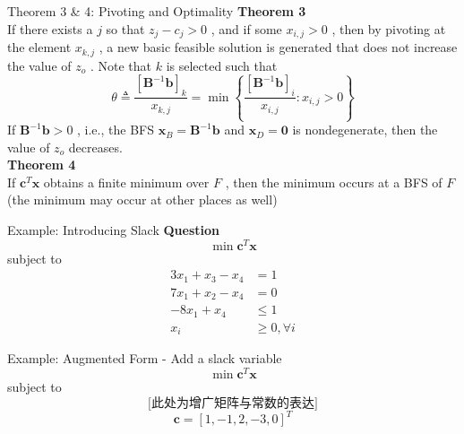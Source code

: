 \documentclass[aspectratio=169,hyperref,UTF8,CJK]{beamer}
\begin{document}
\begin{frame}{Theorem 3 \& 4: Pivoting and Optimality}
\textbf{Theorem 3} \\
If there exists a \(j\) so that \(z_{j} - c_{j} > 0\) , and if some \(x_{i,j} > 0\) , then by pivoting at the element \(x_{k,j}\) , a new basic feasible solution is generated that does not increase the value of \(z_{o}\) . Note that \(k\) is selected such that
\[
\theta \triangleq \frac{[\mathbf{B}^{-1}\mathbf{b}]_{k}}{x_{k,j}} = \min \left\{\frac{[\mathbf{B}^{-1}\mathbf{b}]_{i}}{x_{i,j}}:x_{i,j} > 0\right\}
\]
If \(\mathbf{B}^{- 1}\mathbf{b} > 0\) , i.e., the BFS \(\mathbf{x}_{B} = \mathbf{B}^{- 1}\mathbf{b}\) and \(\mathbf{x}_{D} = \mathbf{0}\) is nondegenerate, then the value of \(z_{o}\) decreases. \\
\textbf{Theorem 4} \\
If \(\mathbf{c}^{T}\mathbf{x}\) obtains a finite minimum over \(F\) , then the minimum occurs at a BFS of \(F\) (the minimum may occur at other places as well)
\end{frame}

\begin{frame}{Example: Introducing Slack}
\textbf{Question} \\
\[
\min \mathbf{c}^T\mathbf{x}
\]
subject to
\begin{align*}
3x_1 + x_3 - x_4 &= 1 \\
7x_1 + x_2 - x_4 &= 0 \\
-8x_1 + x_4 &\leq 1 \\
x_i &\geq 0, \forall i
\end{align*}
\end{frame}

\begin{frame}{Example: Augmented Form}
- Add a slack variable
\[
\min \mathbf{c}^T\mathbf{x}
\]
subject to
\[
\textit{[此处为增广矩阵与常数的表达]}
\]
\[
\mathbf{c} = [1, - 1, 2, - 3, 0]^T
\]
\end{frame}
\end{document}
